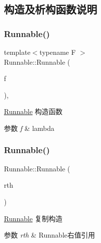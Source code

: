\subsection{构造及析构函数说明}
\mbox{\label{classRunnable_ab052afa8b53dd1e7c28e978962839446}} 
\subsubsection{\texorpdfstring{Runnable()}{Runnable()}\hspace{0.1cm}{\footnotesize\ttfamily [1/3]}}
{\footnotesize\ttfamily template$<$typename F $>$ \\
Runnable\+::\+Runnable (\begin{DoxyParamCaption}\item[{F \&\&}]{f }\end{DoxyParamCaption})\hspace{0.3cm}{\ttfamily [inline]}, {\ttfamily [explicit]}}



\hyperlink{classRunnable}{Runnable} 构造函数 


\begin{DoxyParams}{参数}
{\em f} & lambda \\
\hline
\end{DoxyParams}
\mbox{\label{classRunnable_ab2054720a62d059c59d0e8085d3be78e}} 
\subsubsection{\texorpdfstring{Runnable()}{Runnable()}\hspace{0.1cm}{\footnotesize\ttfamily [2/3]}}
{\footnotesize\ttfamily Runnable\+::\+Runnable (\begin{DoxyParamCaption}\item[{\hyperlink{classRunnable}{Runnable} \&\&}]{rth }\end{DoxyParamCaption})\hspace{0.3cm}{\ttfamily [inline]}}



\hyperlink{classRunnable}{Runnable} 复制构造 


\begin{DoxyParams}{参数}
{\em rth} & Runnable右值引用 \\
\hline
\end{DoxyParams}
\mbox{\label{classRunnable_a9e4d88b5d30d6e0368c5d22a0df203ee}} 
